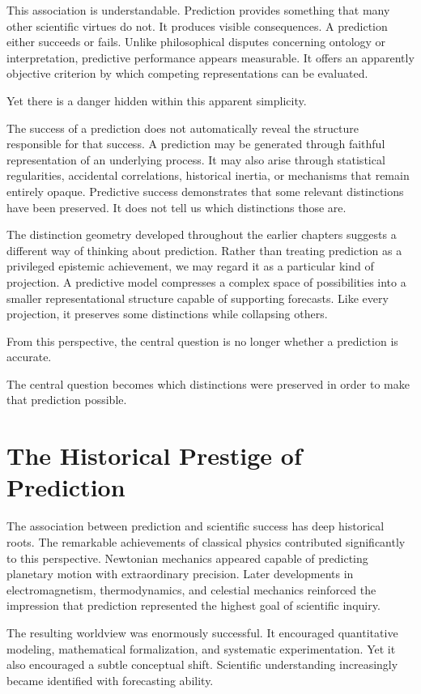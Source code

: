 \documentclass[11pt,oneside,openany]{book}
\begin{document}
This association is understandable. Prediction provides something that many other scientific virtues do not. It produces visible consequences. A prediction either succeeds or fails. Unlike philosophical disputes concerning ontology or interpretation, predictive performance appears measurable. It offers an apparently objective criterion by which competing representations can be evaluated.

Yet there is a danger hidden within this apparent simplicity.

The success of a prediction does not automatically reveal the structure responsible for that success. A prediction may be generated through faithful representation of an underlying process. It may also arise through statistical regularities, accidental correlations, historical inertia, or mechanisms that remain entirely opaque. Predictive success demonstrates that some relevant distinctions have been preserved. It does not tell us which distinctions those are.

The distinction geometry developed throughout the earlier chapters suggests a different way of thinking about prediction. Rather than treating prediction as a privileged epistemic achievement, we may regard it as a particular kind of projection. A predictive model compresses a complex space of possibilities into a smaller representational structure capable of supporting forecasts. Like every projection, it preserves some distinctions while collapsing others.

From this perspective, the central question is no longer whether a prediction is accurate.

The central question becomes which distinctions were preserved in order to make that prediction possible.

\section{The Historical Prestige of Prediction}

The association between prediction and scientific success has deep historical roots. The remarkable achievements of classical physics contributed significantly to this perspective. Newtonian mechanics appeared capable of predicting planetary motion with extraordinary precision. Later developments in electromagnetism, thermodynamics, and celestial mechanics reinforced the impression that prediction represented the highest goal of scientific inquiry.

The resulting worldview was enormously successful. It encouraged quantitative modeling, mathematical formalization, and systematic experimentation. Yet it also encouraged a subtle conceptual shift. Scientific understanding increasingly became identified with forecasting ability.
\end{document}
